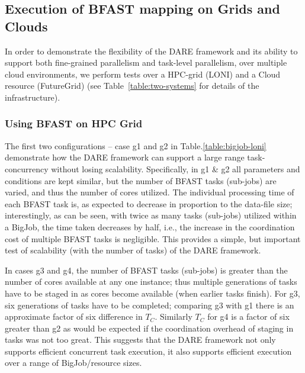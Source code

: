 \documentclass{cpeauth}
\begin{document}

\subsection{Execution of BFAST mapping on Grids and Clouds}

In order to demonstrate the flexibility of the DARE framework and its
ability to support both fine-grained parallelism and task-level
parallelism, over multiple cloud environments, we perform tests over a
HPC-grid (LONI) and a Cloud resource (FutureGrid) (see
Table~\ref{table:two-systems} for details of the infrastructure).


\subsubsection{Using BFAST on HPC Grid}

The first two configurations -- case g1 and g2 in
Table.\ref{table:bigjob-loni} demonstrate how the DARE framework can
support a large range task-concurrency without losing scalability.
Specifically, in g1 \& g2 all parameters and conditions are kept
similar, but the number of BFAST tasks (sub-jobs) are varied, and thus
the number of cores utilized.  The individual processing time of each
BFAST task is, as expected to decrease in proportion to the data-file
size; interestingly, as can be seen, with twice as many tasks
(sub-jobs) utilized within a BigJob, the time taken decreases by half,
i.e., the increase in the coordination cost of multiple BFAST tasks is
negligible. This provides a simple, but important test of scalability
(with the number of tasks) of the DARE framework.  

In cases g3 and g4, the number of BFAST tasks (sub-jobs) is greater
than the number of cores available at any one instance; thus multiple
generations of tasks have to be staged in as cores become available
(when earlier tasks finish).  For g3, six generations of tasks have to
be completed; comparing g3 with g1 there is an approximate factor of
six difference in $T_C$. Similarly $T_C$ for g4 is a factor of six
greater than g2 as would be expected if the coordination overhead of
staging in tasks was not too great. This suggests that the DARE
framework not only supports efficient concurrent task execution, it
also supports efficient execution over a range of BigJob/resource
sizes.
\end{document}

